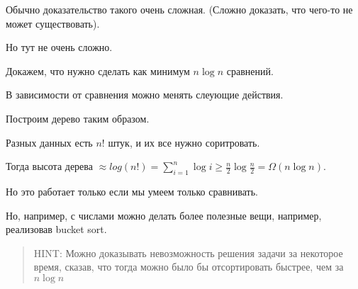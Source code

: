 \documentclass[
]{article}
\begin{document}
Обычно доказательство такого очень сложная. (Сложно доказать, что
чего-то не может существовать).

Но тут не очень сложно.

Докажем, что нужно сделать как минимум \(n \log n\) сравнений.

В зависимости от сравнения можно менять слеующие действия.

Построим дерево таким образом.

Разных данных есть \(n!\) штук, и их все нужно соритровать.

Тогда высота дерева
\(\approx log(n!) = \sum_{i = 1}^{n} \log i \geq \frac{n}{2} \log \frac{n}{2} = \Omega (n \log n)\).

Но это работает только если мы умеем только сравнивать.

Но, например, с числами можно делать более полезные вещи, например,
реализовав bucket sort.

\begin{quote}
HINT: Можно доказывать невозможность решения задачи за некоторое время,
сказав, что тогда можно было бы отсортировать быстрее, чем за
\(n \log n\)
\end{quote}
\end{document}
